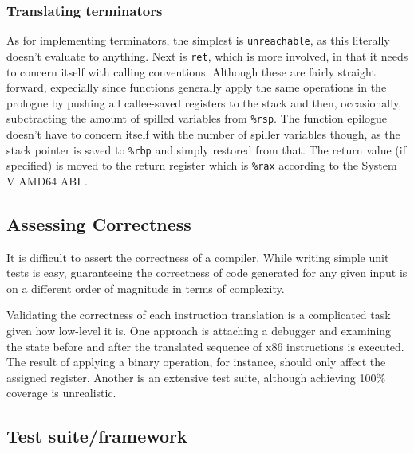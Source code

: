 \documentclass{article}
\begin{document}

\subsubsection{Translating terminators} \label{impl-term}

As for implementing terminators, the simplest is \texttt{unreachable}, as this literally doesn't evaluate to anything.  Next is \texttt{ret}, which is more involved, in that it needs to concern itself with calling conventions.
Although these are fairly straight forward, expecially since functions generally apply the same operations in the prologue by pushing all callee-saved registers to the stack and then, occasionally, subctracting the amount of spilled variables from \texttt{\%rsp}.
The function epilogue doesn't have to concern itself with the number of spiller variables though, as the stack pointer is saved to \texttt{\%rbp} and simply restored from that.
The return value (if specified) is moved to the return register which is \texttt{\%rax} according to the System V AMD64 ABI \cite[26]{sysv}.


%

\subsection{Assessing Correctness}
It is difficult to assert the correctness of a compiler. While writing simple unit tests is easy, guaranteeing the correctness of code generated for any given input is on a different order of magnitude in terms of complexity.

Validating the correctness of each instruction translation is a complicated task given how low-level it is. One approach is attaching a debugger and examining the state before and after the translated sequence of x86 instructions is executed. The result of applying a binary operation,  for instance, should only affect the assigned register. Another is an extensive test suite, although achieving 100\% coverage is unrealistic.

\subsection{Test suite/framework}
\end{document}
